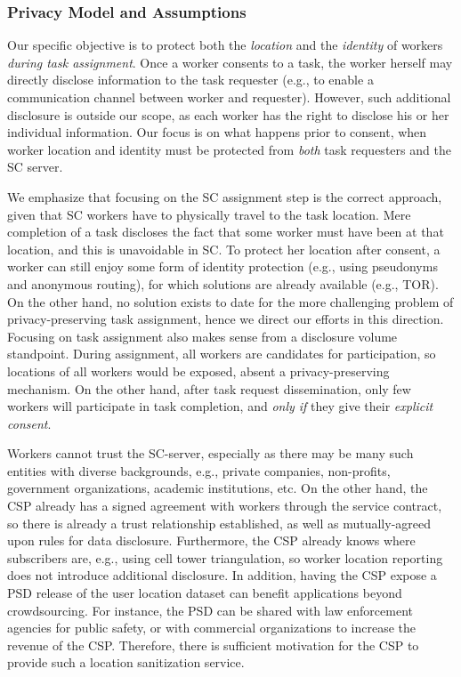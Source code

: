 \documentclass{USC-Thesis}
\numberwithin{equation}{chapter}
\begin{document}
\subsubsection{Privacy Model and Assumptions}
\label{sec:privacy}
Our specific objective is to protect both the {\em location} and the {\em identity} of workers {\em during task assignment}. Once a worker consents to a task, the worker herself may directly disclose information to the task requester (e.g., to enable a communication channel between worker and requester). However, such additional disclosure is outside our scope, as each worker has the right to disclose his or her individual information. Our focus is on what happens prior to consent, when worker location and identity must be protected from {\em both} task requesters and the SC server. 

We emphasize that focusing on the SC assignment step is the correct approach, given that SC workers have to physically travel to the task location. Mere completion of a task discloses the fact that some worker must have been at that location, and this is unavoidable in SC. To protect her location after consent, a worker can still enjoy some form of identity protection (e.g., using pseudonyms and anonymous routing), for which solutions are already available (e.g., TOR). On the other hand, no solution exists to date for the more challenging problem of privacy-preserving task assignment, hence we direct our efforts in this direction.
Focusing on task assignment also makes sense from a disclosure volume standpoint. During assignment, all workers are candidates for participation, so locations of all workers would be exposed, absent a privacy-preserving mechanism. On the other hand, after task request dissemination, only few workers will participate in task completion, and {\em only if} they give their {\em explicit consent}.

Workers cannot trust the SC-server, especially as there may be many such entities with diverse backgrounds, e.g., private companies, non-profits, government organizations, academic institutions, etc. On the other hand, the CSP already has a signed agreement with workers through the service contract, so there is already a trust relationship established, as well as mutually-agreed upon rules for data disclosure. Furthermore, the CSP already knows where subscribers are, e.g., using cell tower triangulation, so worker location reporting does not introduce additional disclosure. In addition, having the CSP expose a PSD release of the user location dataset can benefit applications beyond crowdsourcing. For instance, the PSD can be shared with law enforcement agencies for public safety, or with commercial organizations to increase the revenue of the CSP. Therefore, there is sufficient motivation for the CSP to provide such a location sanitization service.
\end{document}

